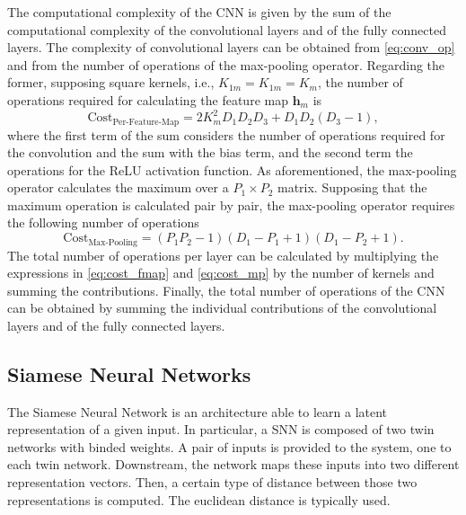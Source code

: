 The computational complexity of the CNN is given by the sum of the computational complexity of the convolutional layers and of the fully connected layers. The complexity of convolutional layers can be obtained from \eqref{eq:conv_op} and from the number of operations of the max-pooling operator. Regarding the former, supposing square kernels, i.e., $K_{1m} = K_{1m} = K_m$, the number of operations required for calculating the feature map $\mathbf{h}_{m}$ is
\begin{equation}
\label{eq:cost_fmap}
\text{Cost}_{\text{Per-Feature-Map}} =2K_m^2D_1D_2D_3+D_1D_2(D_3-1),
\end{equation}
where the first term of the sum considers the number of operations required for the convolution and the sum with the bias term, and the second term the operations for the ReLU activation function. As aforementioned, the max-pooling operator calculates the maximum over a $P_1 \times P_2 $ matrix. Supposing that the maximum operation is calculated pair by pair, the max-pooling operator requires the following number of operations
\begin{equation}\label{eq:cost_mp}
\text{Cost}_{\text{Max-Pooling}}=(P_1P_2-1)(D_1-P_1+1)(D_1-P_2+1).
\end{equation}
The total number of operations per layer can be calculated by multiplying the expressions in \eqref{eq:cost_fmap} and \eqref{eq:cost_mp} by the number of kernels and summing the contributions. Finally, the total number of operations of the CNN can be obtained by summing the individual contributions of the convolutional layers and of the fully connected layers.


\subsection{Siamese Neural Networks}
\label{ssec:siamese}
The Siamese Neural Network is an architecture able to learn a latent representation of a given input. In particular, a SNN is composed of two twin networks with binded weights. A pair of inputs is provided to the system, one to each twin network. Downstream, the network maps these inputs into two different representation vectors. Then, a certain type of distance between those two representations is computed. The euclidean distance is typically used. 

